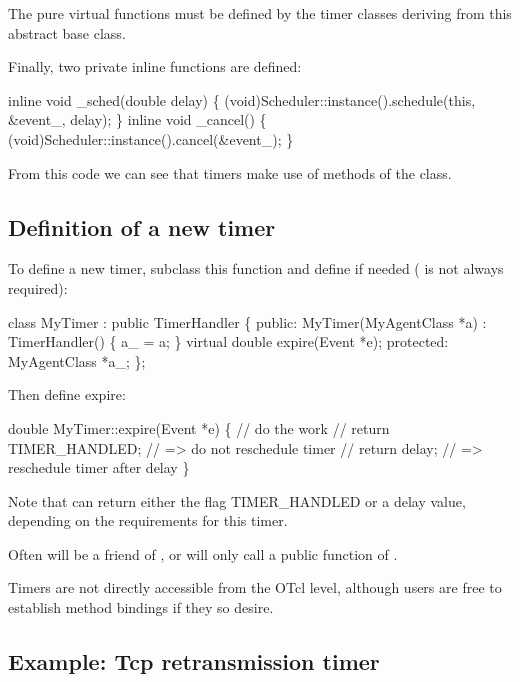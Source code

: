 The pure virtual functions must be defined by the timer classes deriving
from this abstract base class.

Finally, two private inline functions are defined:
\begin{program}
        inline void _sched(double delay) \{
            (void)Scheduler::instance().schedule(this, &event_, delay);
        \}
        inline void _cancel() \{
            (void)Scheduler::instance().cancel(&event_);
        \}
\end{program}

From this code we can see that timers make use of methods of the 
 class.

\subsection{Definition of a new timer}
\label{sec:definition}

To define a new timer, subclass this function and
define  if needed
( is not always required):
\begin{program}
        class MyTimer : public TimerHandler \{
        public:
          MyTimer(MyAgentClass *a) : TimerHandler() \{ a_ = a; \}
          virtual double expire(Event *e);
        protected:
          MyAgentClass *a_;
        \};
\end{program}
Then define expire:
\begin{program}
        double
        MyTimer::expire(Event *e)
        \{
          // {\cf do the work}
          // return TIMER_HANDLED;    // {\cf => do not reschedule timer}
          // return delay;            // {\cf => reschedule timer after delay}
        \}
\end{program}
Note that  can return either the flag TIMER\_HANDLED or a
delay value, depending on the requirements for this timer.

Often  will be a friend of , or 
 will only call a public function of .

Timers are not directly accessible from the OTcl level, although users are
free to establish method bindings if they so desire.

\subsection{Example: Tcp retransmission timer}
\label{sec:timerexample}

